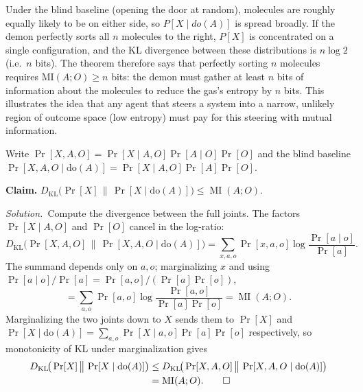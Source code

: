 \documentclass[11pt]{article}
\newcommand{\DKL}{D_{\mathrm{KL}}}
\DeclareMathOperator{\MI}{MI}
\newcommand{\doo}[1]{\mathrm{do}(#1)}
\newcommand{\soln}{\medskip\noindent\textit{Solution.}\ }
\begin{document}
\begin{exercise}
\medskip
\noindent
Under the blind baseline (opening the door at random), molecules are roughly equally
likely to be on either side, so $P[X \mid do(A)]$ is spread broadly. If the demon
perfectly sorts all $n$ molecules to the right, $P[X]$ is concentrated on a single
configuration, and the KL divergence between these distributions is $n \log 2$ (i.e.\
$n$ bits). The theorem therefore says that perfectly sorting $n$ molecules requires
$\mathrm{MI}(A; O) \geq n$ bits: the demon must gather at least $n$ bits of
information about the molecules to reduce the gas's entropy by $n$ bits.
This illustrates the idea that any agent that steers a system into a narrow, unlikely region of outcome space (low entropy) must pay for this steering with mutual information. 
\end{exercise}

\begin{solution}[ex:do-divergence]
Write $\Pr[X,A,O]=\Pr[X\mid A,O]\Pr[A\mid O]\Pr[O]$ and the blind baseline $\Pr[X,A,O\mid\doo{A}]=\Pr[X\mid A,O]\Pr[A]\Pr[O]$.

\textbf{Claim.}
$\DKL\!\big(\Pr[X]\,\big\|\,\Pr[X\mid\doo{A}]\big)\le\MI(A;O)$.


\soln Compute the divergence between the full joints. The factors $\Pr[X\mid A,O]$ and $\Pr[O]$ cancel in the log-ratio:
\[
  \DKL\!\big(\Pr[X,A,O]\,\big\|\,\Pr[X,A,O\mid\doo{A}]\big)
  =\sum_{x,a,o}\Pr[x,a,o]\log\frac{\Pr[a\mid o]}{\Pr[a]}.
\]
The summand depends only on $a,o$; marginalizing $x$ and using $\Pr[a\mid o]/\Pr[a]=\Pr[a,o]/(\Pr[a]\Pr[o])$,
\[
  =\sum_{a,o}\Pr[a,o]\log\frac{\Pr[a,o]}{\Pr[a]\Pr[o]}=\MI(A;O).
\]
Marginalizing the two joints down to $X$ sends them to $\Pr[X]$ and $\Pr[X\mid\doo{A}]=\sum_{a,o}\Pr[X\mid a,o]\Pr[a]\Pr[o]$ respectively, so monotonicity of KL under marginalization gives
\begin{align*}
  \DKL\!\big(\Pr[X]\,\big\|\,\Pr[X\mid\doo{A}]\big)
  &\le\DKL\!\big(\Pr[X,A,O]\,\big\|\,\Pr[X,A,O\mid\doo{A}]\big)\\
  &=\MI(A;O). \qedhere
\end{align*}
\end{solution}
\end{document}
